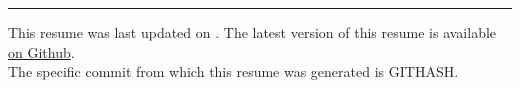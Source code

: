 \documentclass{resume} %
\begin{document}
\vspace{1em}
\hrule
\small \begin{center}This resume was last updated on \DTMnow. The latest version of this resume is available \href{https://sohomdatta1.github.io/cv/artifacts/cv.pdf}{on Github}.\\
\color{white} The specific commit from which this resume was generated is GITHASH.\end{center}
\end{document}
